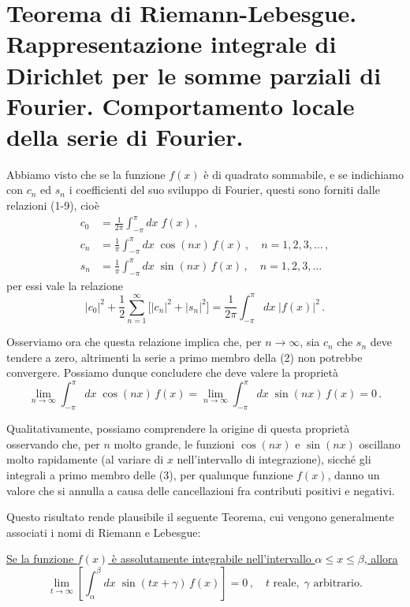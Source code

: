 \documentclass[11pt, a4paper]{book}
\numberwithin{equation}{section}
\begin{document}
\section{Teorema di Riemann-Lebesgue. Rappresentazione integrale di Dirichlet per le somme parziali di Fourier. Comportamento locale della serie di Fourier.}

Abbiamo visto che se la funzione $f(x)$ è di quadrato sommabile, e se indichiamo con $c_n$ ed $s_n$ i coefficienti del suo sviluppo di Fourier, questi sono forniti dalle relazioni (1-9), cioè
\begin{align}
  c_0 &= \frac{1}{2\pi}\int_{-\pi}^{\pi} dx\;f(x)\,, \tag{1a}\\
  c_n &= \frac{1}{\pi}\int_{-\pi}^{\pi} dx\;\cos(nx)\,f(x)\,,\quad n=1,2,3,\ldots\,, \tag{1b}\\
  s_n &= \frac{1}{\pi}\int_{-\pi}^{\pi} dx\;\sin(nx)\,f(x)\,,\quad n=1,2,3,\ldots \tag{1c}
\end{align}
per essi vale la relazione
\begin{equation}
  |c_0|^2 + \frac{1}{2}\sum_{n=1}^{\infty}\bigl[|c_n|^2+|s_n|^2\bigr]
  = \frac{1}{2\pi}\int_{-\pi}^{\pi} dx\;|f(x)|^2\,. \tag{2}
\end{equation}

Osserviamo ora che questa relazione implica che, per $n\to\infty$, sia $c_n$ che $s_n$ deve tendere a zero, altrimenti la serie a primo membro della (2) non potrebbe convergere. Possiamo dunque concludere che deve valere la proprietà
\begin{equation}
  \lim_{n\to\infty}\int_{-\pi}^{\pi} dx\;\cos(nx)\,f(x)
  = \lim_{n\to\infty}\int_{-\pi}^{\pi} dx\;\sin(nx)\,f(x) = 0\,. \tag{3}
\end{equation}

Qualitativamente, possiamo comprendere la origine di questa proprietà osservando che, per $n$ molto grande, le funzioni $\cos(nx)$ e $\sin(nx)$ oscillano molto rapidamente (al variare di $x$ nell'intervallo di integrazione), sicché gli integrali a primo membro delle (3), per qualunque funzione $f(x)$, danno un valore che si annulla a causa delle cancellazioni fra contributi positivi e negativi.

Questo risultato rende plausibile il seguente Teorema, cui vengono generalmente associati i nomi di Riemann e Lebesgue:

\uline{Se la funzione $f(x)$ è assolutamente integrabile nell'intervallo $\alpha \leq x \leq \beta$, allora}
\begin{equation}
  \lim_{t\to\infty}\left[\int_\alpha^\beta dx\;\sin(tx+\gamma)\,f(x)\right] = 0\,,
  \quad t \text{ reale},\; \gamma \text{ arbitrario.} \tag{4}
\end{equation}
\end{document}
